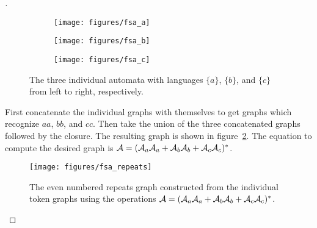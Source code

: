 \begin{proof}[\unskip\nopunct]

\begin{figure}
    \centering
    \begin{subfigure}[b]{0.32\textwidth}
        \centering
        \texttt{[image: figures/fsa\_a]}
    \end{subfigure}
    \begin{subfigure}[b]{0.32\textwidth}
        \centering
        \texttt{[image: figures/fsa\_b]}
    \end{subfigure}
    \begin{subfigure}[b]{0.32\textwidth}
        \centering
        \texttt{[image: figures/fsa\_c]}
    \end{subfigure}
    \caption{The three individual automata with languages $\{a\}$, $\{b\}$, and
    $\{c\}$ from left to right, respectively.}
    \label{fig:fsa_tokens}
\end{figure}

First concatenate the individual graphs with themselves to get graphs which
recognize $aa$, $bb$, and $cc$. Then take the union of the three
concatenated graphs followed by the closure. The resulting graph is shown
in figure~\ref{fig:fsa_repeats}. The equation to compute the desired graph
is $\mathcal{A} = (\mathcal{A}_a\mathcal{A}_a + \mathcal{A}_b\mathcal{A}_b + \mathcal{A}_c\mathcal{A}_c)^*$.

\begin{figure}
    \centering
    \texttt{[image: figures/fsa\_repeats]}
    \caption{The even numbered repeats graph constructed from the individual
    token graphs using the operations $\mathcal{A} = (\mathcal{A}_a\mathcal{A}_a + \mathcal{A}_b\mathcal{A}_b +
    \mathcal{A}_c\mathcal{A}_c)^*$.}
    \label{fig:fsa_repeats}
\end{figure}

\end{proof}
